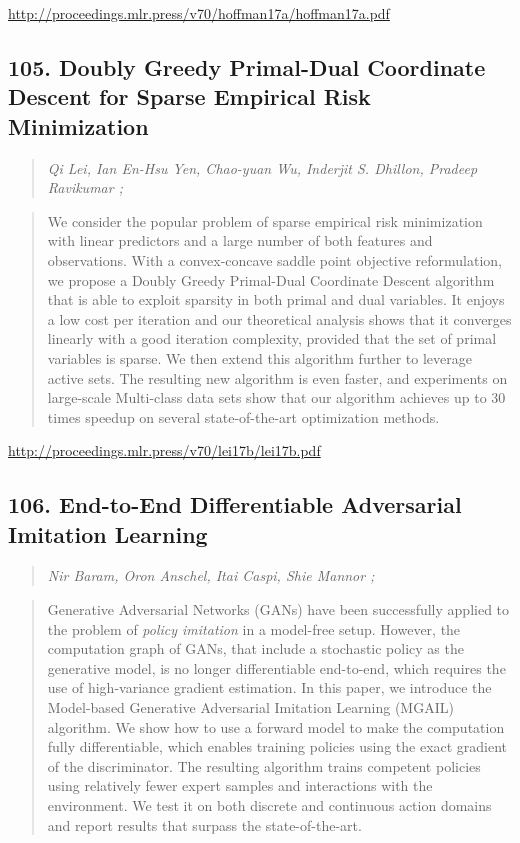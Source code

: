 \documentclass{article}
\begin{document}
\href{http://proceedings.mlr.press/v70/hoffman17a/hoffman17a.pdf}{http://proceedings.mlr.press/v70/hoffman17a/hoffman17a.pdf}

\subsection{105. Doubly Greedy Primal-Dual Coordinate Descent for Sparse Empirical Risk Minimization}

\begin{quote}
\footnotesize{\textit{Qi Lei, Ian En-Hsu Yen, Chao-yuan Wu, Inderjit S. Dhillon, Pradeep Ravikumar ;}}

\end{quote}

\begin{quote}
    We consider the popular problem of sparse empirical risk minimization with linear predictors and a large number of both features and observations. With a convex-concave saddle point objective reformulation, we propose a Doubly Greedy Primal-Dual Coordinate Descent algorithm that is able to exploit sparsity in both primal and dual variables. It enjoys a low cost per iteration and our theoretical analysis shows that it converges linearly with a good iteration complexity, provided that the set of primal variables is sparse. We then extend this algorithm further to leverage active sets. The resulting new algorithm is even faster, and experiments on large-scale Multi-class data sets show that our algorithm achieves up to 30 times speedup on several state-of-the-art optimization methods.  
\end{quote}

\href{http://proceedings.mlr.press/v70/lei17b/lei17b.pdf}{http://proceedings.mlr.press/v70/lei17b/lei17b.pdf}

\subsection{106. End-to-End Differentiable Adversarial Imitation Learning}

\begin{quote}
\footnotesize{\textit{Nir Baram, Oron Anschel, Itai Caspi, Shie Mannor ;}}

\end{quote}

\begin{quote}
    Generative Adversarial Networks (GANs) have been successfully applied to the problem of \textit{policy imitation} in a model-free setup. However, the computation graph of GANs, that include a stochastic policy as the generative model, is no longer differentiable end-to-end, which requires the use of high-variance gradient estimation. In this paper, we introduce the Model-based Generative Adversarial Imitation Learning (MGAIL) algorithm. We show how to use a forward model to make the computation fully differentiable, which enables training policies using the exact gradient of the discriminator. The resulting algorithm trains competent policies using relatively fewer expert samples and interactions with the environment. We test it on both discrete and continuous action domains and report results that surpass the state-of-the-art.  
\end{quote}
\end{document}
